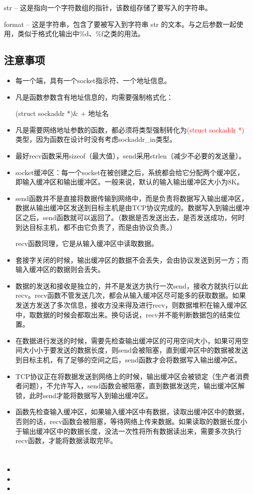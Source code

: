 \documentclass[UTF8]{article}%
\begin{document}
str -- 这是指向一个字符数组的指针，该数组存储了要写入的字符串。

format -- 这是字符串，包含了要被写入到字符串 str 的文本。与之后参数一起使用，类似于格式化输出中\%d、\%f之类的用法。



\subsection{注意事项}

\begin{itemize}
    \item 每一个端，具有一个socket指示符、一个地址信息。
    \item 凡是函数参数含有地址信息的，均需要强制格式化：
    
    (struct sockaddr *)\& + 地址名

    \item 凡是需要网络地址参数的函数，都必须将类型强制转化为\textcolor{red}{(struct sockaddr *)}类型，因为函数在设计时没有考虑sockaddr\_in类型。
    \item 最好recv函数采用sizeof（最大值），send采用strlen（减少不必要的发送量）。
    \item socket缓冲区：每一个socket在被创建之后，系统都会给它分配两个缓冲区，即输入缓冲区和输出缓冲区。一般来说，默认的输入输出缓冲区大小为8K。
    \item send函数并不是直接将数据传输到网络中，而是负责将数据写入输出缓冲区，数据从输出缓冲区发送到目标主机是由TCP协议完成的。数据写入到输出缓冲区之后，send函数就可以返回了。（数据是否发送出去，是否发送成功，何时到达目标主机，都不由它负责了，而是由协议负责。）
    
    recv函数同理，它是从输入缓冲区中读取数据。

    \item 套接字关闭的时候，输出缓冲区的数据不会丢失，会由协议发送到另一方；而输入缓冲区的数据则会丢失。
    \item 数据的发送和接收是独立的，并不是发送方执行一次send，接收方就执行以此recv。recv函数不管发送几次，都会从输入缓冲区尽可能多的获取数据。如果发送方发送了多次信息，接收方没来得及进行recv，则数据堆积在输入缓冲区中，取数据的时候会都取出来。换句话说，recv并不能判断数据包的结束位置。
    \item 在数据进行发送的时候，需要先检查输出缓冲区的可用空间大小，如果可用空间大小小于要发送的数据长度，则send会被阻塞，直到缓冲区中的数据被发送到目标主机，有了足够的空间之后，send函数才会将数据写入输出缓冲区。
    \item TCP协议正在将数据发送到网络上的时候，输出缓冲区会被锁定（生产者消费者问题），不允许写入，send函数会被阻塞，直到数据发送完，输出缓冲区解锁，此时send才能将数据写入到输出缓冲区。
    \item 函数先检查输入缓冲区，如果输入缓冲区中有数据，读取出缓冲区中的数据，否则的话，recv函数会被阻塞，等待网络上传来数据。如果读取的数据长度小于输出缓冲区中的数据长度，没法一次性将所有数据读出来，需要多次执行recv函数，才能将数据读取完毕。
\end{itemize}

\section{}




\begin{itemize}
    \item 
    \item 
    \item 
\end{itemize}
\end{document}
